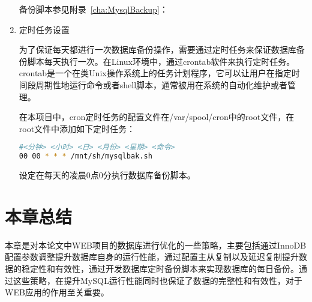 \begin{enumerate}
备份脚本参见附录~\ref{cha:MysqlBackup}：


\item 定时任务设置

为了保证每天都进行一次数据库备份操作，需要通过定时任务来保证数据库备份脚本每天执行一次。在Linux环境中，通过crontab软件来执行定时任务。crontab是一个在类Unix操作系统上的任务计划程序，它可以让用户在指定时间段周期性地运行命令或者shell脚本，通常被用在系统的自动化维护或者管理。

在本项目中，cron定时任务的配置文件在/var/spool/cron中的root文件，在root文件中添加如下定时任务：
\begin{lstlisting}[language=sh,numbers=none]
#<分钟> <小时> <日> <月份> <星期> <命令>
00 00 * * * /mnt/sh/mysqlbak.sh
\end{lstlisting}
设定在每天的凌晨0点0分执行数据库备份脚本。
\end{enumerate}
\section{本章总结}

本章是对本论文中WEB项目的数据库进行优化的一些策略，主要包括通过InnoDB配置参数调整提升数据库自身的运行性能，通过配置主从复制以及延迟复制提升数据的稳定性和有效性，通过开发数据库定时备份脚本来实现数据库的每日备份。通过这些策略，在提升MySQL运行性能同时也保证了数据的完整性和有效性，对于WEB应用的作用至关重要。